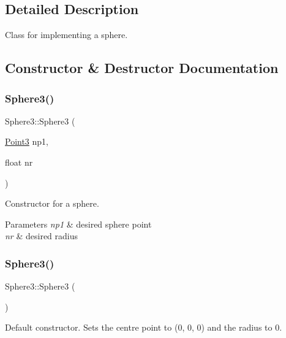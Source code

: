 \subsection{Detailed Description}
Class for implementing a sphere. 

\subsection{Constructor \& Destructor Documentation}
\mbox{\label{class_sphere3_af70e61fde5085502a572acb306f968cd}} 
\subsubsection{\texorpdfstring{Sphere3()}{Sphere3()}\hspace{0.1cm}{\footnotesize\ttfamily [1/2]}}
{\footnotesize\ttfamily Sphere3\+::\+Sphere3 (\begin{DoxyParamCaption}\item[{\mbox{\hyperlink{class_point3}{Point3}}}]{np1,  }\item[{float}]{nr }\end{DoxyParamCaption})}



Constructor for a sphere. 


\begin{DoxyParams}{Parameters}
{\em np1} & desired sphere point \\
\hline
{\em nr} & desired radius \\
\hline
\end{DoxyParams}
\mbox{\label{class_sphere3_a0231ba10d45f03ca7ab21cbd525339f5}} 
\subsubsection{\texorpdfstring{Sphere3()}{Sphere3()}\hspace{0.1cm}{\footnotesize\ttfamily [2/2]}}
{\footnotesize\ttfamily Sphere3\+::\+Sphere3 (\begin{DoxyParamCaption}{ }\end{DoxyParamCaption})}



Default constructor. Sets the centre point to (0, 0, 0) and the radius to 0. 



